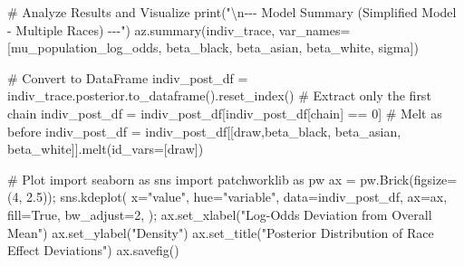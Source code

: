 \documentclass[
]{agujournal2019}
\newenvironment{Shaded}{\begin{snugshade}}{\end{snugshade}}
\newcommand{\BuiltInTok}[1]{\textcolor[rgb]{0.00,0.23,0.31}{#1}}
\newcommand{\CharTok}[1]{\textcolor[rgb]{0.13,0.47,0.30}{#1}}
\newcommand{\CommentTok}[1]{\textcolor[rgb]{0.37,0.37,0.37}{#1}}
\newcommand{\DecValTok}[1]{\textcolor[rgb]{0.68,0.00,0.00}{#1}}
\newcommand{\FloatTok}[1]{\textcolor[rgb]{0.68,0.00,0.00}{#1}}
\newcommand{\ImportTok}[1]{\textcolor[rgb]{0.00,0.46,0.62}{#1}}
\newcommand{\NormalTok}[1]{\textcolor[rgb]{0.00,0.23,0.31}{#1}}
\newcommand{\OperatorTok}[1]{\textcolor[rgb]{0.37,0.37,0.37}{#1}}
\newcommand{\StringTok}[1]{\textcolor[rgb]{0.13,0.47,0.30}{#1}}
\newcommand{\VariableTok}[1]{\textcolor[rgb]{0.07,0.07,0.07}{#1}}
\begin{document}
\begin{Shaded}
\begin{Highlighting}[]
\CommentTok{\# Analyze Results and Visualize}
\BuiltInTok{print}\NormalTok{(}\StringTok{"}\CharTok{\textbackslash{}n}\StringTok{{-}{-}{-} Model Summary (Simplified Model {-} Multiple Races) {-}{-}{-}"}\NormalTok{)}
\NormalTok{az.summary(indiv\_trace, var\_names}\OperatorTok{=}\NormalTok{[}\StringTok{\textquotesingle{}mu\_population\_log\_odds\textquotesingle{}}\NormalTok{, }\StringTok{\textquotesingle{}beta\_black\textquotesingle{}}\NormalTok{, }\StringTok{\textquotesingle{}beta\_asian\textquotesingle{}}\NormalTok{, }\StringTok{\textquotesingle{}beta\_white\textquotesingle{}}\NormalTok{, }\StringTok{\textquotesingle{}sigma\textquotesingle{}}\NormalTok{])}

\CommentTok{\# Convert to DataFrame}
\NormalTok{indiv\_post\_df }\OperatorTok{=}\NormalTok{ indiv\_trace.posterior.to\_dataframe().reset\_index()}
\CommentTok{\# Extract only the first chain}
\NormalTok{indiv\_post\_df }\OperatorTok{=}\NormalTok{ indiv\_post\_df[indiv\_post\_df[}\StringTok{\textquotesingle{}chain\textquotesingle{}}\NormalTok{] }\OperatorTok{==} \DecValTok{0}\NormalTok{]}
\CommentTok{\# Melt as before}
\NormalTok{indiv\_post\_df }\OperatorTok{=}\NormalTok{ indiv\_post\_df[[}\StringTok{\textquotesingle{}draw\textquotesingle{}}\NormalTok{,}\StringTok{\textquotesingle{}beta\_black\textquotesingle{}}\NormalTok{, }\StringTok{\textquotesingle{}beta\_asian\textquotesingle{}}\NormalTok{, }\StringTok{\textquotesingle{}beta\_white\textquotesingle{}}\NormalTok{]].melt(id\_vars}\OperatorTok{=}\NormalTok{[}\StringTok{\textquotesingle{}draw\textquotesingle{}}\NormalTok{])}

\CommentTok{\# Plot}
\ImportTok{import}\NormalTok{ seaborn }\ImportTok{as}\NormalTok{ sns}
\ImportTok{import}\NormalTok{ patchworklib }\ImportTok{as}\NormalTok{ pw}
\NormalTok{ax }\OperatorTok{=}\NormalTok{ pw.Brick(figsize}\OperatorTok{=}\NormalTok{(}\DecValTok{4}\NormalTok{, }\FloatTok{2.5}\NormalTok{))}\OperatorTok{;}
\NormalTok{sns.kdeplot(}
\NormalTok{    x}\OperatorTok{=}\StringTok{"value"}\NormalTok{, hue}\OperatorTok{=}\StringTok{"variable"}\NormalTok{, data}\OperatorTok{=}\NormalTok{indiv\_post\_df, ax}\OperatorTok{=}\NormalTok{ax,}
\NormalTok{    fill}\OperatorTok{=}\VariableTok{True}\NormalTok{, bw\_adjust}\OperatorTok{=}\DecValTok{2}\NormalTok{,}
\NormalTok{)}\OperatorTok{;}
\NormalTok{ax.set\_xlabel(}\StringTok{"Log{-}Odds Deviation from Overall Mean"}\NormalTok{)}
\NormalTok{ax.set\_ylabel(}\StringTok{"Density"}\NormalTok{)}
\NormalTok{ax.set\_title(}\StringTok{"Posterior Distribution of Race Effect Deviations"}\NormalTok{)}
\NormalTok{ax.savefig()}
\end{Highlighting}
\end{Shaded}
\end{document}
